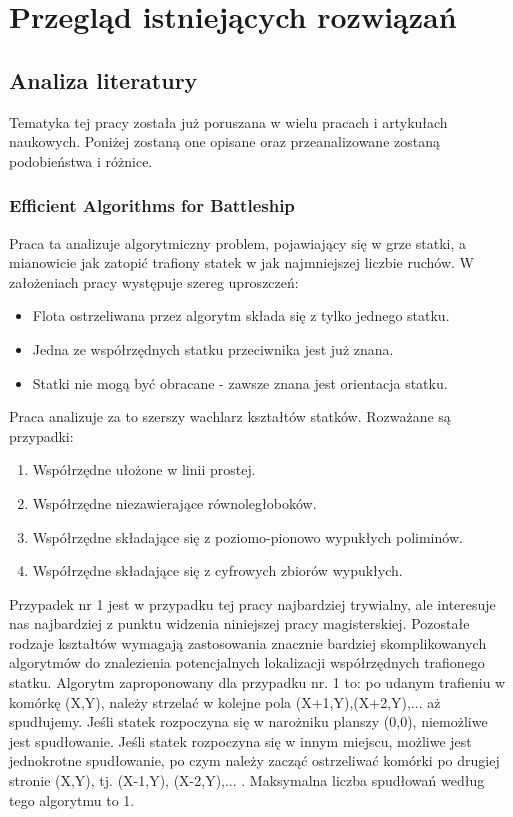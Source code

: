 \newpage %
\section{Przegląd istniejących rozwiązań}

\subsection{Analiza literatury}
Tematyka tej pracy została już poruszana w wielu pracach i artykułach naukowych. Poniżej zostaną one opisane oraz przeanalizowane zostaną podobieństwa i różnice.

\subsubsection{Efficient Algorithms for Battleship \cite{crombez2020efficient}}
Praca ta analizuje algorytmiczny problem, pojawiający się w grze statki, a mianowicie jak zatopić trafiony statek w jak najmniejszej liczbie ruchów. W założeniach pracy występuje szereg uproszczeń:
\begin{itemize}
    \item Flota ostrzeliwana przez algorytm składa się z tylko jednego statku.
    \item Jedna ze współrzędnych statku przeciwnika jest już znana.
    \item Statki nie mogą być obracane - zawsze znana jest orientacja statku.
\end{itemize}
Praca analizuje za to szerszy wachlarz kształtów statków. Rozważane są przypadki:
\begin{enumerate}
    \item Współrzędne ułożone w linii prostej.
    \item Współrzędne niezawierające równoległoboków.
    \item Współrzędne składające się z poziomo-pionowo wypukłych poliminów.
    \item Współrzędne składające się z cyfrowych zbiorów wypukłych.
\end{enumerate}

Przypadek nr 1 jest w przypadku tej pracy najbardziej trywialny, ale interesuje nas najbardziej z punktu widzenia niniejszej pracy magisterskiej. Pozostałe rodzaje kształtów wymagają zastosowania znacznie bardziej skomplikowanych algorytmów do znalezienia potencjalnych lokalizacji współrzędnych trafionego statku.
Algorytm zaproponowany dla przypadku nr. 1 to: po udanym trafieniu w komórkę (X,Y), należy strzelać w kolejne pola (X+1,Y),(X+2,Y),... aż spudłujemy. Jeśli statek rozpoczyna się w narożniku planszy (0,0), niemożliwe jest spudłowanie. Jeśli statek rozpoczyna się w innym miejscu, możliwe jest jednokrotne spudłowanie, po czym należy zacząć ostrzeliwać komórki po drugiej stronie (X,Y), tj. (X-1,Y), (X-2,Y),... . Maksymalna liczba spudłowań według tego algorytmu to 1.


